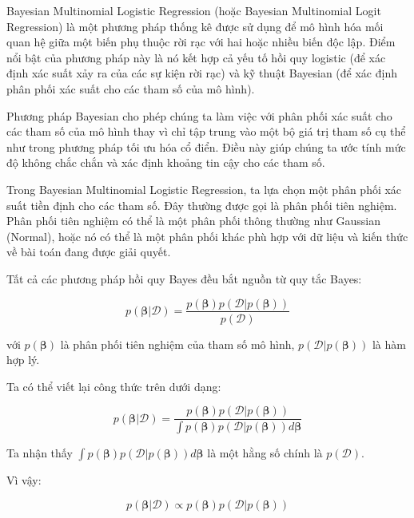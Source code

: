 Bayesian Multinomial Logistic Regression (hoặc Bayesian Multinomial Logit Regression) là một phương pháp thống kê được sử dụng để mô hình hóa mối quan hệ giữa một biến phụ thuộc rời rạc với hai hoặc nhiều biến độc lập. 
Điểm nổi bật của phương pháp này là nó kết hợp cả yếu tố hồi quy logistic (để xác định xác suất xảy ra của các sự kiện rời rạc) và kỹ thuật Bayesian (để xác định phân phối xác suất cho các tham số của mô hình).

Phương pháp Bayesian cho phép chúng ta làm việc với phân phối xác suất cho các tham số của mô hình thay vì chỉ tập trung vào một bộ giá trị tham số cụ thể như trong phương pháp tối ưu hóa cổ điển. 
Điều này giúp chúng ta ước tính mức độ không chắc chắn và xác định khoảng tin cậy cho các tham số.

Trong Bayesian Multinomial Logistic Regression, ta lựa chọn một phân phối xác suất tiền định cho các tham số. Đây thường được gọi là phân phối tiên nghiệm. 
Phân phối tiên nghiệm có thể là một phân phối thông thường như Gaussian (Normal), hoặc nó có thể là một phân phối khác phù hợp với dữ liệu và kiến thức về bài toán đang được giải quyết.

Tất cả các phương pháp hồi quy Bayes đều bắt nguồn từ quy tắc Bayes:

\begin{equation*}
    p (\boldsymbol{\beta} \vert \mathcal{D}) = \dfrac{p(\boldsymbol{\beta}) p (\mathcal{D} \vert p(\boldsymbol{\beta}))}{p(\mathcal{D})}
\end{equation*}

với $p(\boldsymbol{\beta})$ là phân phối tiên nghiệm của tham số mô hình, $p (\mathcal{D} \vert p(\boldsymbol{\beta}))$ là hàm hợp lý.

Ta có thể viết lại công thức trên dưới dạng:

\begin{equation*}
    p (\boldsymbol{\beta} \vert \mathcal{D}) = \dfrac{p(\boldsymbol{\beta}) p (\mathcal{D} \vert p(\boldsymbol{\beta}))}{\int p(\boldsymbol{\beta}) p (\mathcal{D} \vert p(\boldsymbol{\beta})) d \boldsymbol{\beta}}
\end{equation*}

Ta nhận thấy $\int p(\boldsymbol{\beta}) p (\mathcal{D} \vert p(\boldsymbol{\beta})) d \boldsymbol{\beta}$ là một hằng số chính là $p(\mathcal{D})$.

Vì vậy:

\begin{equation*}
    p (\boldsymbol{\beta} \vert \mathcal{D}) \propto p(\boldsymbol{\beta}) p (\mathcal{D} \vert p(\boldsymbol{\beta}))
\end{equation*}

